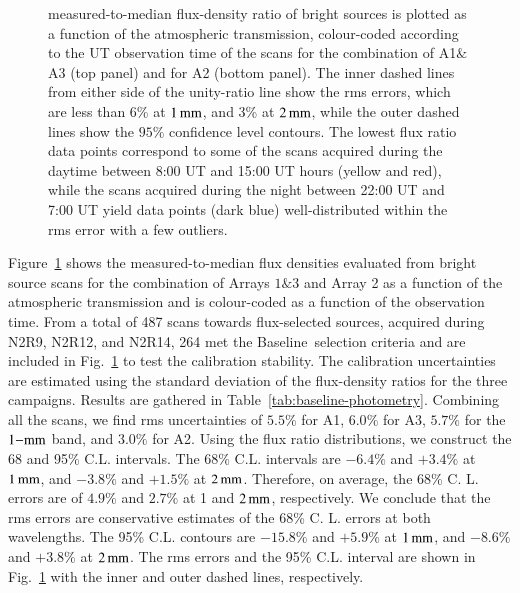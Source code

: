 \documentclass[traditionalabstract]{aa}
\newcommand{\baseline}{Baseline}%
\newcommand{\lp}[1]{#1}
\begin{document}
{\begin{figure}[!thbp]
\begin{center}
{      measured-to-median flux-density ratio of bright sources is
      plotted as a function of the atmospheric transmission,
      colour-coded according to the UT
      observation time of the scans for the combination of A1$\&$A3
      (top panel)
      and for A2 (bottom panel).
      The inner dashed lines from either side of the
      unity-ratio line show the rms errors, {\lp which
      are less than 6\% at $1\,\rm{mm}$, and 3\% at $2\,\rm{mm}$, while
      the outer dashed lines show the $95\%$ confidence level contours.}
      The lowest flux ratio data points correspond to some of the
      scans acquired during the daytime between 8:00 UT and 15:00 UT
      hours (yellow and red), while the scans acquired during the night
      between 22:00 UT and 7:00 UT yield data points (dark blue)
      well-distributed within the rms error with a few outliers.}
    \label{fig:allbright_rms_corrected_skydip}
  \end{center}
\end{figure}
Figure~\ref{fig:allbright_rms_corrected_skydip} shows the
measured-to-median flux densities evaluated from bright source scans
for the combination of Arrays $1\&3$ and Array 2 as a function of the
atmospheric transmission and is colour-coded as a function of the
observation time. From a total of 487 scans towards
flux-selected sources, acquired during N2R9, N2R12, and N2R14, 264 met
the \baseline\ selection criteria and are included in
Fig.~\ref{fig:allbright_rms_corrected_skydip} to test the
calibration stability. The calibration uncertainties are
estimated using the standard deviation of the flux-density ratios for
the three campaigns. Results are gathered in
Table~\ref{tab:baseline-photometry}.
Combining all the scans, we find rms uncertainties of $5.5\%$ for A1,
$6.0\%$ for A3, $5.7\%$ for the $1\rm{-mm}$ band, and $3.0\%$ for A2.
{\lp Using the flux ratio distributions, we construct the 68 and 95\%
C.L. intervals. The 68\% C.L. intervals are $-6.4\%$ and $+3.4\%$ at
$1\,\rm{mm}$, and $-3.8\%$ and $+1.5\%$ at $2\, \rm{mm}$. Therefore, on average,
the 68\% C. L. errors are of $4.9\%$ and $2.7\%$ at 1 and $2\, \rm{mm}$,
respectively. We conclude that the rms errors are conservative
estimates of the 68\% C. L. errors at both wavelengths. The 95\%
C.L. contours are $-15.8\%$ and $+5.9\%$ at $1\,\rm{mm}$, and $-8.6\%$ and
$+3.8\%$ at $2\, \rm{mm}$.
The rms errors and the 95\%
C.L. interval are shown in
Fig.~\ref{fig:allbright_rms_corrected_skydip} with the inner and
outer dashed lines, respectively.} 

}
\end{document}
